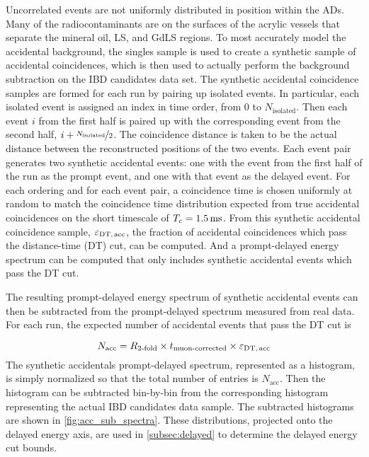 
Uncorrelated events are not uniformly distributed
in position within the ADs.
Many of the radiocontaminants are on the surfaces of the
acrylic vessels that separate the mineral oil, LS, and GdLS regions.
To most accurately model the accidental background,
the singles sample is used to create a synthetic sample of accidental coincidences,
which is then used to actually perform the background subtraction
on the IBD candidates data set.
The synthetic accidental coincidence samples are formed for each run
by pairing up isolated events.
In particular, each isolated event is assigned an index in time order,
from $0$ to $N_{\text{isolated}}$.
Then each event $i$ from the first half is paired up with
the corresponding event from the second half, $i + \nicefrac{N_{\text{isolated}}}{2}$.
The coincidence distance is taken to be the actual distance
between the reconstructed positions of the two events.
Each event pair generates two synthetic accidental events:
one with the event from the first half of the run as the prompt event,
and one with that event as the delayed event.
For each ordering and for each event pair, a coincidence time is chosen
uniformly at random to match the coincidence time distribution
expected from true accidental coincidences on the short timescale
of $T_c=\SI{1.5}{\milli\second}$.
From this synthetic accidental coincidence sample, $\varepsilon_{\text{DT,\,acc}}$,
the fraction of accidental  coincidences which pass the distance-time (DT) cut,
can be computed.
And a prompt-delayed energy spectrum can be computed that only includes
synthetic accidental events which pass the DT cut. %

The resulting prompt-delayed energy spectrum of synthetic accidental events
can then be subtracted
from the prompt-delayed spectrum measured from real data.
For each run, the expected number of accidental events that pass the DT cut is

\begin{equation}
    N_{\text{acc}} = R_{\text{\ensuremath{2}-fold}} \times t_{\text{muon-corrected}}
        \times \varepsilon_{\text{DT,\,acc}}
    \label{eq:nacc}
\end{equation}
The synthetic accidentals prompt-delayed spectrum, represented as a histogram,
is simply normalized so that the total number of entries is $N_{\text{acc}}$.
Then the histogram can be subtracted bin-by-bin from the corresponding histogram
representing the actual IBD candidates data sample.
The subtracted histograms are shown in \cref{fig:acc_sub_spectra}.
These distributions, projected onto the delayed energy axis,
are used in \cref{subsec:delayed} to determine the delayed energy cut bounds.


